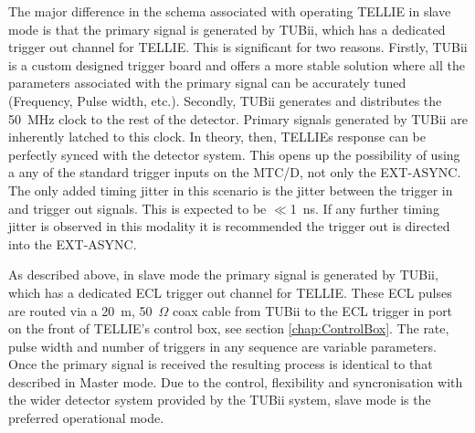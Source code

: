 \documentclass[12pt]{report}
\begin{document}
The major difference in the schema associated with operating TELLIE in slave mode is that the primary signal is generated by TUBii, which has a dedicated trigger out channel for TELLIE. This is significant for two reasons. Firstly, TUBii is a custom designed trigger board and offers a more stable solution where all the parameters associated with the primary signal can be accurately tuned (Frequency, Pulse width, etc.). Secondly, TUBii generates and distributes the 50~MHz clock to the rest of the detector. Primary signals generated by TUBii are inherently latched to this clock. In theory, then, TELLIEs response can be perfectly synced with the detector system. This opens up the possibility of using a any of the standard trigger inputs on the MTC/D, not only the EXT-ASYNC. The only added timing jitter in this scenario is the jitter between the trigger in and trigger out signals. This is expected to be $\ll$1~ns. If any further timing jitter is observed in this modality it is recommended the trigger out is directed into the EXT-ASYNC. 

As described above, in slave mode the primary signal is generated by TUBii, which has a dedicated ECL trigger out channel for TELLIE. These ECL pulses are routed via a 20~m, 50~$\Omega$ coax cable from TUBii to the ECL trigger in port on the front of TELLIE's control box, see section \ref{chap:ControlBox}. The rate, pulse width and number of triggers in any sequence are variable parameters. Once the primary signal is received the resulting process is identical to that described in Master mode. Due to the control, flexibility and syncronisation with the wider detector system provided by the TUBii system, slave mode is the preferred operational mode. %
\end{document}
